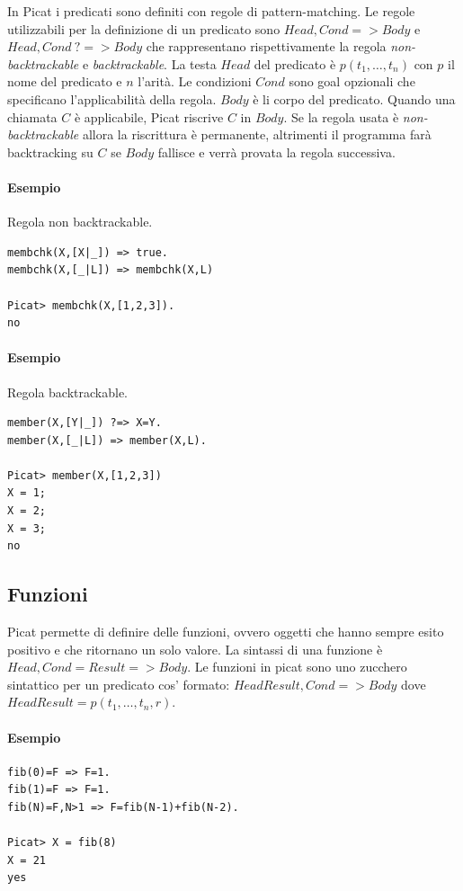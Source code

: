 \documentclass[12pt,a4paper,openright]{book} %
\begin{document}
In Picat i predicati sono definiti con regole di pattern-matching. Le
regole utilizzabili per la definizione di un predicato sono $Head,
Cond => Body$ e $Head, Cond\ ?=> Body$ che rappresentano
rispettivamente la regola \emph{non-backtrackable} e
\emph{backtrackable}. La testa $Head$ del predicato è $p(t_1, \ldots,
t_n)$ con $p$ il nome del predicato e $n$ l'arità. Le condizioni
$Cond$ sono goal opzionali che specificano l'applicabilità della
regola. $Body$ è li corpo del predicato.  Quando una chiamata $C$ è
applicabile, Picat riscrive $C$ in $Body$. Se la regola usata è
\emph{non-backtrackable} allora la riscrittura è permanente,
altrimenti il programma farà backtracking su $C$ se $Body$ fallisce e
verrà provata la regola successiva.

\paragraph{Esempio} Regola non backtrackable.
\begin{verbatim}
membchk(X,[X|_]) => true.
membchk(X,[_|L]) => membchk(X,L)

Picat> membchk(X,[1,2,3]).
no
\end{verbatim}

\paragraph{Esempio} Regola backtrackable.
\begin{verbatim}
member(X,[Y|_]) ?=> X=Y.
member(X,[_|L]) => member(X,L).

Picat> member(X,[1,2,3])
X = 1;
X = 2;
X = 3;
no
\end{verbatim}

\subsection{Funzioni}
\label{subsec:picat_base_func}

Picat permette di definire delle funzioni, ovvero oggetti che hanno
sempre esito positivo e che ritornano un solo valore. La sintassi di
una funzione è $Head, Cond = Result => Body$. Le funzioni in picat
sono uno zucchero sintattico per un predicato cos' formato:
$HeadResult, Cond => Body$ dove $HeadResult = p(t_1, \ldots, t_n, r)$.

\paragraph{Esempio}
\begin{verbatim}
fib(0)=F => F=1.
fib(1)=F => F=1.
fib(N)=F,N>1 => F=fib(N-1)+fib(N-2).

Picat> X = fib(8)
X = 21
yes
\end{verbatim}
\end{document}
